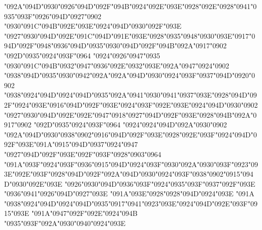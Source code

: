 {\char"092A}{\char"094D}{\char"0930}{\char"0926}{\char"094D}{\char"092F}{\char"094B}{\char"0924}{\char"092E}{\char"093E}{\char"0928}{\char"092E}{\char"0928}{\char"0941}{\char"0935}{\char"093F}{\char"0926}{\char"094D}{\char"0927}{\char"0902} {\char"0930}{\char"091C}{\char"094B}{\char"092E}{\char"093E}{\char"0924}{\char"094D}{\char"0930}{\char"092F}{\char"093E} {\char"0927}{\char"0930}{\char"094D}{\char"092E}{\char"091C}{\char"094D}{\char"091E}{\char"093E}{\char"0928}{\char"0935}{\char"0948}{\char"0930}{\char"093E}{\char"0917}{\char"094D}{\char"092F}{\char"0948}{\char"0936}{\char"094D}{\char"0935}{\char"0930}{\char"094D}{\char"092F}{\char"094B}{\char"092A}{\char"0917}{\char"0902} {\char"092D}{\char"0935}{\char"0924}{\char"093F}{\char"0964} {\char"0924}{\char"0926}{\char"0947}{\char"0935} {\char"0930}{\char"091C}{\char"094B}{\char"0932}{\char"0947}{\char"0936}{\char"092E}{\char"0932}{\char"093E}{\char"092A}{\char"0947}{\char"0924}{\char"0902} {\char"0938}{\char"094D}{\char"0935}{\char"0930}{\char"0942}{\char"092A}{\char"092A}{\char"094D}{\char"0930}{\char"0924}{\char"093F}{\char"0937}{\char"094D}{\char"0920}{\char"0902} {\char"0938}{\char"0924}{\char"094D}{\char"0924}{\char"094D}{\char"0935}{\char"092A}{\char"0941}{\char"0930}{\char"0941}{\char"0937}{\char"093E}{\char"0928}{\char"094D}{\char"092F}{\char"0924}{\char"093E}{\char"0916}{\char"094D}{\char"092F}{\char"093E}{\char"0924}{\char"093F}{\char"092E}{\char"093E}{\char"0924}{\char"094D}{\char"0930}{\char"0902} {\char"0927}{\char"0930}{\char"094D}{\char"092E}{\char"092E}{\char"0947}{\char"0918}{\char"0927}{\char"094D}{\char"092F}{\char"093E}{\char"0928}{\char"094B}{\char"092A}{\char"0917}{\char"0902} {\char"092D}{\char"0935}{\char"0924}{\char"093F}{\char"0964} {\char"0924}{\char"0924}{\char"094D}{\char"092A}{\char"0930}{\char"0902} {\char"092A}{\char"094D}{\char"0930}{\char"0938}{\char"0902}{\char"0916}{\char"094D}{\char"092F}{\char"093E}{\char"0928}{\char"092E}{\char"093F}{\char"0924}{\char"094D}{\char"092F}{\char"093E}{\char"091A}{\char"0915}{\char"094D}{\char"0937}{\char"0924}{\char"0947} {\char"0927}{\char"094D}{\char"092F}{\char"093E}{\char"092F}{\char"093F}{\char"0928}{\char"0903}{\char"0964} {\char"091A}{\char"093F}{\char"0924}{\char"093F}{\char"0936}{\char"0915}{\char"094D}{\char"0924}{\char"093F}{\char"0930}{\char"092A}{\char"0930}{\char"093F}{\char"0923}{\char"093E}{\char"092E}{\char"093F}{\char"0928}{\char"094D}{\char"092F}{\char"092A}{\char"094D}{\char"0930}{\char"0924}{\char"093F}{\char"0938}{\char"0902}{\char"0915}{\char"094D}{\char"0930}{\char"092E}{\char"093E} {\char"0926}{\char"0930}{\char"094D}{\char"0936}{\char"093F}{\char"0924}{\char"0935}{\char"093F}{\char"0937}{\char"092F}{\char"093E} {\char"0936}{\char"0941}{\char"0926}{\char"094D}{\char"0927}{\char"093E} {\char"091A}{\char"093E}{\char"0928}{\char"0928}{\char"094D}{\char"0924}{\char"093E} {\char"091A} {\char"0938}{\char"0924}{\char"094D}{\char"0924}{\char"094D}{\char"0935}{\char"0917}{\char"0941}{\char"0923}{\char"093E}{\char"0924}{\char"094D}{\char"092E}{\char"093F}{\char"0915}{\char"093E} {\char"091A}{\char"0947}{\char"092F}{\char"092E}{\char"0924}{\char"094B} {\char"0935}{\char"093F}{\char"092A}{\char"0930}{\char"0940}{\char"0924}{\char"093E} 